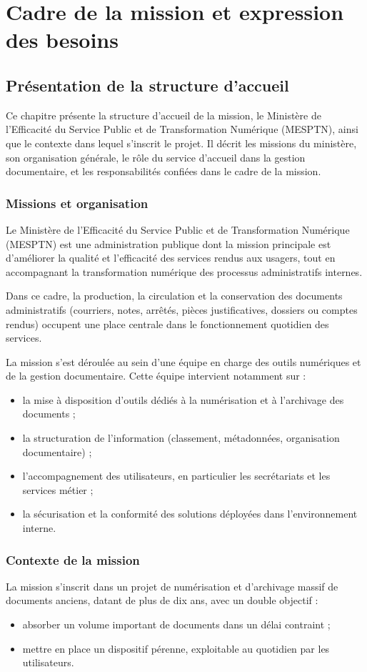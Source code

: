 \documentclass[12pt,a4paper]{report}
\newcommand{\nomMinistere}{Ministère de l'Efficacité du Service Public et de Transformation Numérique (MESPTN)}
\begin{document}
\part{Cadre de la mission et expression des besoins}
\chapter{Présentation de la structure d’accueil}
Ce chapitre présente la structure d’accueil de la mission, le \nomMinistere{}, ainsi que le contexte dans lequel s’inscrit le projet. Il décrit les missions du ministère, son organisation générale, le rôle du service d’accueil dans la gestion documentaire, et les responsabilités confiées dans le cadre de la mission.

\section{Missions et organisation}
Le \nomMinistere{} est une administration publique dont la mission principale est d’améliorer la qualité et l’efficacité des services rendus aux usagers, tout en accompagnant la transformation numérique des processus administratifs internes.

Dans ce cadre, la production, la circulation et la conservation des documents administratifs (courriers, notes, arrêtés, pièces justificatives, dossiers ou comptes rendus) occupent une place centrale dans le fonctionnement quotidien des services.

La mission s’est déroulée au sein d’une équipe en charge des outils numériques et de la gestion documentaire. Cette équipe intervient notamment sur :
\begin{itemize}
  \item la mise à disposition d’outils dédiés à la numérisation et à l’archivage des documents ;
  \item la structuration de l’information (classement, métadonnées, organisation documentaire) ;
  \item l’accompagnement des utilisateurs, en particulier les secrétariats et les services métier ;
  \item la sécurisation et la conformité des solutions déployées dans l’environnement interne.
\end{itemize}

\section{Contexte de la mission}
La mission s’inscrit dans un projet de numérisation et d’archivage massif de documents anciens, datant de plus de dix ans, avec un double objectif :
\begin{itemize}
  \item absorber un volume important de documents dans un délai contraint ;
  \item mettre en place un dispositif pérenne, exploitable au quotidien par les utilisateurs.
\end{itemize}
\end{document}
